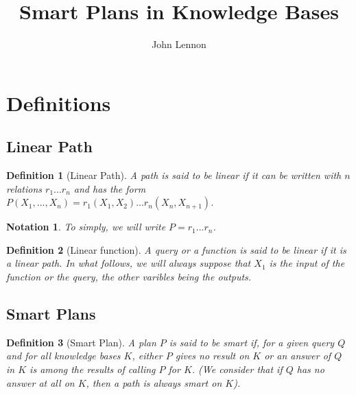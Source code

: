 \documentclass[10pt,a4paper,draft]{article}
\title{Smart Plans in Knowledge Bases}
\author{John Lennon}
\begin{document}
\maketitle

\newtheorem{Definition}{Definition}
\newtheorem{Property}{Property}
\newtheorem{Theorem}{Theorem}
\newtheorem{Lemma}{Lemma}
\newtheorem{Corrollary}{Corrollary}
\newtheorem{Hypothesis}{Hypothesis}
\newtheorem{Notation}{Notation}
\newtheorem{Example}{Example}

\LinesNumbered


\section{Definitions}

\subsection{Linear Path}

\begin{Definition}[Linear Path]
A path is said to be linear if it can be written with $n$ relations $r_1 ... r_n$ and has the form $P(X_1, ..., X_n) = r_1(X_1, X_2) ... r_n(X_n, X_{n+1})$.
\end{Definition}

\begin{Notation}
To simply, we will write $P = r_1 ... r_n$.
\end{Notation}

\begin{Definition}[Linear function]
A query or a function is said to be linear if it is a linear path. In what follows, we will always suppose that $X_1$ is the input of the function or the query, the other varibles being the outputs.
\end{Definition}


\subsection{Smart Plans}

\begin{Definition}[Smart Plan]
A plan $P$ is said to be smart if, for a given query $Q$ and for all knowledge bases $K$, either $P$ gives no result on $K$ or an answer of $Q$ in $K$ is among the results of calling $P$ for $K$. (We consider that if $Q$ has no answer at all on $K$, then a path is always smart on $K$).
\end{Definition}
\end{document}
